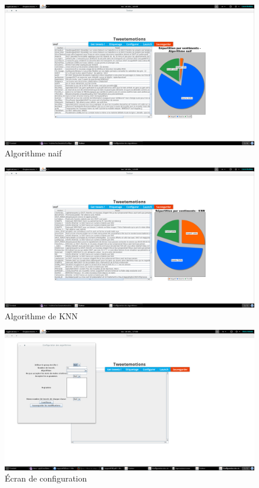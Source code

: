 \documentclass[a4paper,10pt]{report}
\begin{document}
      \begin{figure}[H]
	\centering
	\includegraphics[scale=0.2]{impressions-ecran/dico.png}
	\caption{Algorithme naif}
	\label{dico}
      \end{figure}
      \begin{figure}[H]
	\centering
	\includegraphics[scale=0.2]{impressions-ecran/KNN.png}
	\caption{Algorithme de KNN}
	\label{KNN}
      \end{figure}
      \begin{figure}[H]
	\centering
	\includegraphics[scale=0.2]{impressions-ecran/config.png}
	\caption{Écran de configuration}
	\label{config}
      \end{figure}
      
\end{document}
